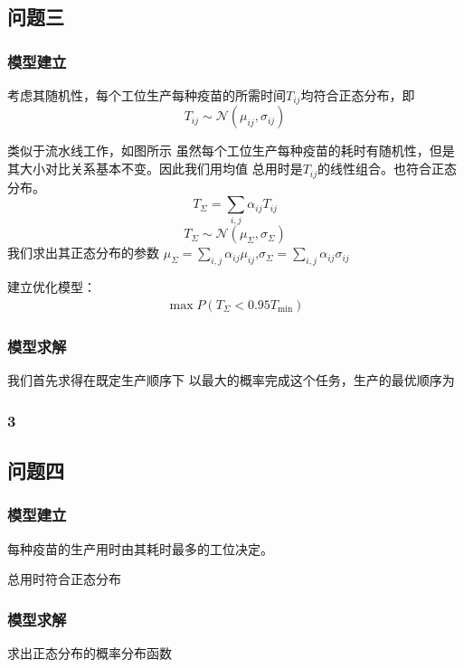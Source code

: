 \documentclass[UTF8]{ctexart}
\begin{document}
	\subsection{问题三}
	\subsubsection{模型建立}
	考虑其随机性，每个工位生产每种疫苗的所需时间$T_{ij}$均符合正态分布，即
	\begin{equation}
		T_{ij}\sim\mathcal{N}(\mu_{ij},\sigma_{ij})
	\end{equation}
	
	类似于流水线工作，如图所示
	虽然每个工位生产每种疫苗的耗时有随机性，但是其大小对比关系基本不变。因此我们用均值
	总用时是$T_{ij}$的线性组合。也符合正态分布。
	\begin{equation}
		T_{\Sigma}=\sum_{i,j}\alpha_{ij}T_{ij}
	\end{equation}
	\begin{equation}
		T_{\Sigma}\sim\mathcal{N}(\mu_{\Sigma},\sigma_{\Sigma})
	\end{equation}
	我们求出其正态分布的参数
	$\mu_{\Sigma}=\sum_{i,j}\alpha_{ij}\mu_{ij}$,$\sigma_{\Sigma}=\sum_{i,j}\alpha_{ij}\sigma_{ij}$
	\par 建立优化模型：
	\begin{equation}
	\begin{split}
		\max P(T_{\Sigma}<0.95T_{\min})
	\end{split}
	\end{equation}
	\subsubsection{模型求解}
	我们首先求得在既定生产顺序下
	以最大的概率完成这个任务，生产的最优顺序为
	\subsubsection{3}
	
	\subsection{问题四}
	\subsubsection{模型建立}
	每种疫苗的生产用时由其耗时最多的工位决定。
	\par 总用时符合正态分布
	\subsubsection{模型求解}
	求出正态分布的概率分布函数
\end{document}
